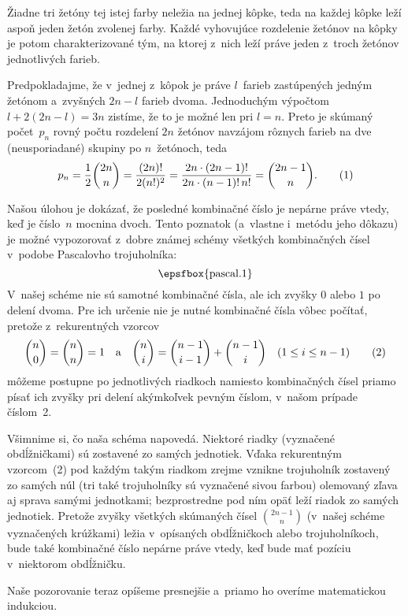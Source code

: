 {%
Žiadne tri žetóny tej istej farby neležia na jednej kôpke, teda na každej
kôpke leží aspoň jeden žetón zvolenej farby.
Každé vyhovujúce rozdelenie žetónov na kôpky je potom charakterizované tým,
na ktorej z~nich leží práve jeden z~troch žetónov
jednotlivých farieb.

Predpokladajme, že v~jednej z~kôpok je práve $l$~farieb zastúpených jedným
žetónom a~zvyšných $2n-l$ farieb dvoma. Jednoduchým výpočtom $l+2(2n-l)=3n$
zistíme, že to je možné len pri $l=n$.
Preto je skúmaný počet~$p_n$ rovný počtu rozdelení $2n$ žetónov navzájom rôznych farieb
na dve (neusporiadané) skupiny po $n$~žetónoch, teda
$$
p_n=\frac12\binom{2n}{n}=\frac{(2n)!}{2(n!)^2}=
\frac{2n\cdot(2n-1)!}{2n\cdot(n-1)!\,n!}=\binom{2n-1}{n}.  \tag1
$$

Našou úlohou je dokázať, že posledné kombinačné
číslo je nepárne práve vtedy, keď je číslo~$n$ mocnina dvoch.
Tento poznatok (a~vlastne i~metódu jeho dôkazu)
je možné vypozorovať z~dobre známej schémy všetkých
kombinačných čísel v~podobe Pascalovho trojuholníka:
$$
\hbox{\epsfbox{pascal.1}}
$$
V~našej schéme nie sú samotné kombinačné čísla,
ale ich zvyšky $0$ alebo $1$ po delení dvoma. Pre ich určenie
nie je nutné kombinačné čísla vôbec počítať, pretože
z~rekurentných vzorcov
$$
\binom{n}{0}=\binom{n}{n}=1\quad\text{a}\quad
\binom{n}{i}=\binom{n-1}{i-1}+\binom{n-1}{i}\quad (1\le i\le n-1)
\tag2
$$
môžeme postupne po jednotlivých riadkoch namiesto kombinačných
čísel priamo písať ich zvyšky pri delení akýmkoľvek
pevným číslom, v~našom prípade číslom~2.

Všimnime si, čo naša schéma napovedá. Niektoré riadky
(vyznačené obdĺžničkami) sú zostavené zo samých jednotiek.
Vďaka rekurentným vzorcom~(2) pod každým takým riadkom zrejme
vznikne trojuholník zostavený zo samých núl (tri také trojuholníky sú
vyznačené sivou farbou) olemovaný zľava aj sprava samými
jednotkami; bezprostredne pod ním
opäť leží riadok zo samých jednotiek. Pretože zvyšky všetkých skúmaných
čísel $\binom{2n-1}{n}$ (v~našej schéme vyznačených krúžkami)
ležia v~opísaných obdĺžničkoch alebo
trojuholníkoch, bude také kombinačné číslo nepárne práve vtedy, keď bude
mať pozíciu v~niektorom obdĺžničku.

Naše pozorovanie teraz opíšeme presnejšie a~priamo ho overíme matematickou
indukciou.

}

